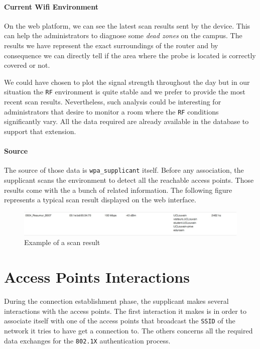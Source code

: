 \paragraph*{Current Wifi Environment} On the web platform, we can see the latest scan results sent by the device. This can help the administrators to diagnose some \emph{dead zones} on the campus. The results we have represent the exact surroundings of the router and by consequence we can directly tell if the area where the probe is located is correctly covered or not. 

We could have chosen to plot the signal strength throughout the day but in our situation the \texttt{RF} environment is quite stable and we prefer to provide the most recent scan results. Nevertheless, such analysis could be interesting for administrators that desire to monitor a room where the \texttt{RF} conditions significantly vary. All the data required are already available in the database to support that extension.

\paragraph*{Source} The source of those data is \texttt{wpa\_supplicant} itself. Before any association, the supplicant scans the environment to detect all the reachable access points. Those results come with the a bunch of related information. The following figure represents a typical scan result displayed on the web interface.

\begin{figure}[H]
	\centering
   \includegraphics[width=1\textwidth]{Pictures/chapter6/scan-result.jpg}
   \caption{Example of a scan result}
\end{figure} 


\section{Access Points Interactions}
During the connection establishment phase, the supplicant makes several interactions with the access points. The first interaction it makes is in order to associate itself with one of the access points that broadcast the \texttt{SSID} of the network it tries to have get a connection to. The others concerns all the required data exchanges for the \texttt{802.1X} authentication process.

